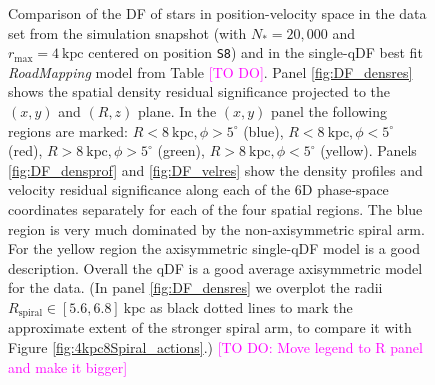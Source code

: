 \documentclass[iop,revtex4,numberedappendix,appendixfloats]{emulateapj}
\newcommand{\RM}{{\sl RoadMapping}}
\newcommand{\Wilma}[1]{\textcolor{Magenta}{#1}}
\begin{document}
\begin{figure}[!htbp]
  \centering
  \caption{Comparison of the DF of stars in position-velocity space in the data set from the simulation snapshot (with $N_*=20,000$ and $r_\text{max}=4~\text{kpc}$ centered on position \texttt{S8}) and in the single-qDF best fit \RM{} model from Table \Wilma{[TO DO]}. Panel \ref{fig:DF_densres} shows the spatial density residual significance projected to the $(x,y)$ and $(R,z)$ plane. In the $(x,y)$ panel the following regions are marked: $R<8~\text{kpc},\phi>5^\circ$ (blue), $R<8~\text{kpc},\phi<5^\circ$ (red), $R>8~\text{kpc},\phi>5^\circ$ (green), $R>8~\text{kpc},\phi<5^\circ$ (yellow). Panels \ref{fig:DF_densprof} and \ref{fig:DF_velres} show the density profiles and velocity residual significance along each of the 6D phase-space coordinates separately for each of the four spatial regions. The blue region is very much dominated by the non-axisymmetric spiral arm. For the yellow region the axisymmetric single-qDF model is a good description. Overall the qDF is a good average axisymmetric model for the data. (In panel \ref{fig:DF_densres} we overplot the radii $R_\text{spiral} \in [5.6,6.8]~\text{kpc}$ as black dotted lines to mark the approximate extent of the stronger spiral arm, to compare it with Figure \ref{fig:4kpc8Spiral_actions}.) \Wilma{[TO DO: Move legend to R panel and make it bigger]}}

\end{figure}
\end{document}
